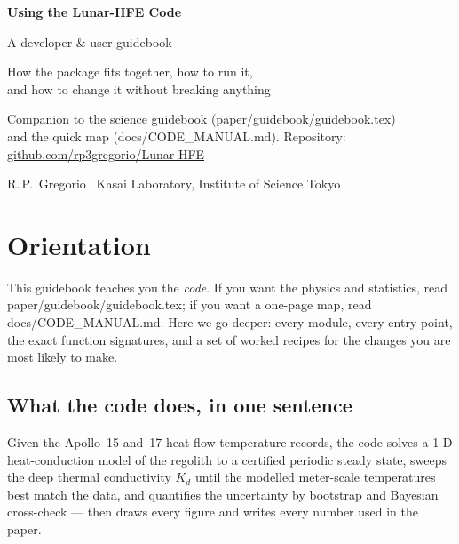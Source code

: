 \documentclass[11pt]{report}
\newcommand{\file}[1]{\textcolor{forest}{\ttfamily #1}}
\begin{document}
\begin{titlepage}
\centering
\vspace*{3cm}
{\sffamily\bfseries\color{forest}\Huge Using the Lunar-HFE Code\par}
\vspace{8mm}
{\sffamily\Large\color{char} A developer \& user guidebook\par}
\vspace{4mm}
{\large\color{dim} How the package fits together, how to run it,\\
and how to change it without breaking anything\par}
\vfill
{\color{dim} Companion to the science guidebook (\file{paper/guidebook/guidebook.tex})\\
and the quick map (\file{docs/CODE\_MANUAL.md}). Repository:
\href{https://github.com/rp3gregorio/Lunar-HFE}{github.com/rp3gregorio/Lunar-HFE}\par}
\vspace{1cm}
{\color{dim} R.\,P.\ Gregorio \textperiodcentered\ Kasai Laboratory, Institute of Science Tokyo\par}
\end{titlepage}

\tableofcontents
\clearpage

\chapter{Orientation}

This guidebook teaches you the \emph{code}. If you want the physics and
statistics, read \file{paper/guidebook/guidebook.tex}; if you want a
one-page map, read \file{docs/CODE\_MANUAL.md}. Here we go deeper: every
module, every entry point, the exact function signatures, and a set of
worked recipes for the changes you are most likely to make.

\section{What the code does, in one sentence}

Given the Apollo~15 and~17 heat-flow temperature records, the code solves
a 1-D heat-conduction model of the regolith to a certified periodic
steady state, sweeps the deep thermal conductivity $K_d$ until the
modelled meter-scale temperatures best match the data, and quantifies the
uncertainty by bootstrap and Bayesian cross-check --- then draws every
figure and writes every number used in the paper.
\end{document}
